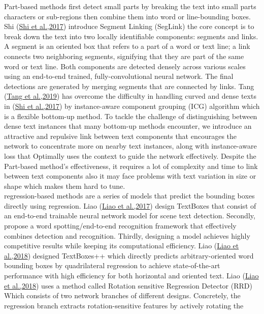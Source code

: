 Part-based methods first detect small parts by breaking the text into small parts characters or sub-regions then combine them into word or line-bounding boxes. Shi (\hyperref[Shi2017]{Shi et al.,2017}) introduce Segment Linking (SegLink) the core concept is to break down the text into two locally identifiable components: segments and links. A segment is an oriented box that refers to a part of a word or text line; a link connects two neighboring segments, signifying that they are part of the same word or text line. Both components are detected densely across various scales using an end-to-end trained, fully-convolutional neural network. The final detections are generated by merging segments that are connected by links. Tang (\hyperref[Tang2019]{Tang et al.,2019}) has overcome the difficulty in handling curved and dense texts in (\hyperref[Shi2017]{Shi et al.,2017}) by instance-aware component grouping (ICG) algorithm which is a flexible bottom-up method. To tackle the challenge of distinguishing between dense text instances that many bottom-up methods encounter, we introduce an attractive and repulsive link between text components that encourages the network to concentrate more on nearby text instances, along with instance-aware loss that Optimally uses the context to guide the network effectively. Despite the Part-based method's effectiveness, it requires a lot of complexity and time to link between text components also it may face problems with text variation in size or shape which makes them hard to tune.\\
regression-based methods are a series of models that predict the bounding boxes directly using regression. Liao (\hyperref[Liao2017]{Liao et al.,2017}) design TextBoxes that consist of an end-to-end trainable neural network model for scene text detection. Secondly, propose a word spotting/end-to-end recognition framework that effectively combines detection and recognition. Thirdly, designing a model
achieves highly competitive results while keeping its computational efficiency. Liao (\hyperref[Liao2018]{Liao et al.,2018}) designed TextBoxes++ which directly predicts arbitrary-oriented word bounding boxes by quadrilateral regression to achieve state-of-the-art performance with high efficiency for both horizontal and oriented text. Liao (\hyperref[Liao2018+]{Liao et al.,2018}) uses a method called Rotation sensitive Regression Detector (RRD) Which consists of two network branches of different designs. Concretely, the regression branch extracts rotation-sensitive features by actively rotating the
